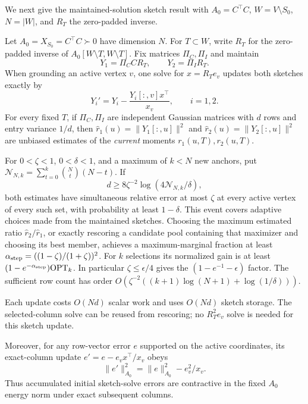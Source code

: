 We next give the maintained-solution sketch result with $A_0=C^\top C$,
$W=V\setminus S_0$, $N=|W|$, and $R_T$ the zero-padded inverse.
\begin{proposition}
\label{prop:maintainedsketch}
Let $A_0=X_{S_0}=C^\top C\succ0$ have dimension $N$.
For $T\subset W$, write $R_T$ for the zero-padded inverse of
$A_0[W\setminus T,W\setminus T]$. Fix matrices $\Pi_C,\Pi_I$ and maintain
\[
 Y_1=\Pi_C C R_T,\qquad Y_2=\Pi_I R_T.
\]
When grounding an active vertex $v$, one solve for $x=R_Te_v$
updates both sketches exactly by
\[
 Y_i' =Y_i-\frac{Y_i[:,v]x^\top}{x_v},\qquad i=1,2.
\]
For every fixed $T$, if $\Pi_C,\Pi_I$ are independent Gaussian matrices
with $d$ rows and entry variance $1/d$, then
$\widehat r_1(u)=\|Y_1[:,u]\|^2$ and
$\widehat r_2(u)=\|Y_2[:,u]\|^2$ are unbiased estimates of the
\emph{current} moments $r_1(u,T),r_2(u,T)$.

For $0<\zeta<1$, $0<\delta<1$, and a maximum of $k<N$ new anchors,
put $\mathcal N_{N,k}=\sum_{t=0}^k\binom Nt(N-t)$. If
\[
 d\geq8\zeta^{-2}\log(4\mathcal N_{N,k}/\delta),
\]
both estimates have simultaneous relative error at most $\zeta$
at every active vertex of every such set, with probability at
least $1-\delta$. This event covers adaptive choices made from
the maintained sketches. Choosing the maximum estimated ratio
$\widehat r_2/\widehat r_1$, or exactly rescoring a candidate
pool containing that maximizer and choosing its best member,
achieves a maximum-marginal fraction at least
$\alpha_{\rm step}=((1-\zeta)/(1+\zeta))^2$. For $k$ selections its
normalized gain is at least $(1-e^{-\alpha_{\rm step}})\mathrm{OPT}_k$.
In particular $\zeta\leq\epsilon/4$ gives the
$(1-e^{-1}-\epsilon)$ factor. The sufficient row count has order
$O(\zeta^{-2}((k+1)\log(N+1)+\log(1/\delta)))$.

Each update costs $O(Nd)$ scalar work and uses $O(Nd)$ sketch
storage. The selected-column solve can be reused from rescoring;
no $R_T^2e_v$ solve is needed for this sketch update.

Moreover, for any row-vector error $e$ supported on the active
coordinates, its exact-column update $e'=e-e_vx^\top/x_v$ obeys
\[
 \|e'\|_{A_0}^2=\|e\|_{A_0}^2-e_v^2/x_v.
\]
Thus accumulated initial sketch-solve errors are contractive in
the fixed $A_0$ energy norm under exact subsequent columns.
\end{proposition}
